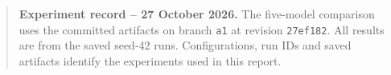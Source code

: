 \documentclass[a4paper,12pt]{article}
\begin{document}
\thispagestyle{empty}
\null
\clearpage

\thispagestyle{plain}
\begingroup
\small
\tableofcontents
\endgroup
\clearpage
{}

\begin{quote}
\small
\textbf{Experiment record -- 27 October 2026.}
The five-model comparison uses the committed artifacts on branch \texttt{a1}
at revision \texttt{27ef182}\cite{code}. All results are from the saved seed-42
runs. Configurations, run IDs and saved artifacts identify the experiments used in this report.
\end{quote}






\end{document}
